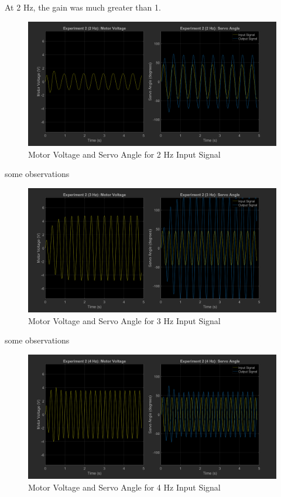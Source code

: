 \documentclass[12pt]{article}
\begin{document}
At 2 Hz, the gain was much greater than 1.
\begin{figure}[h!]
    \centering
    \includegraphics[width=\textwidth]{exp2_2}
    \caption{\label{fig:exp2_2}Motor Voltage and Servo Angle for 2 Hz Input Signal}
\end{figure}

some observations
\begin{figure}[h!]
    \centering
    \includegraphics[width=\textwidth]{exp2_3}
    \caption{\label{fig:exp2_3}Motor Voltage and Servo Angle for 3 Hz Input Signal}
\end{figure}

some observations
\begin{figure}[h!]
    \centering
    \includegraphics[width=\textwidth]{exp2_4}
    \caption{\label{fig:exp2_4}Motor Voltage and Servo Angle for 4 Hz Input Signal}
\end{figure}
\end{document}
